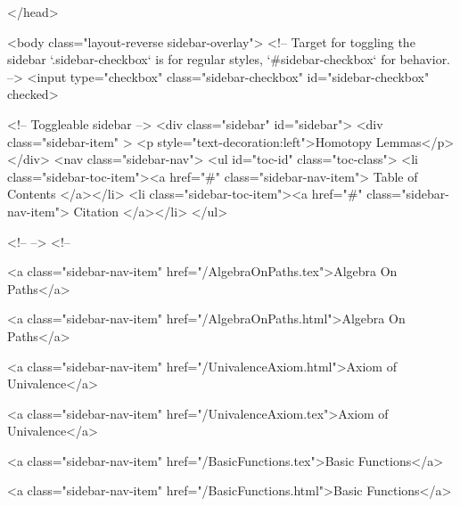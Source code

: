   
</head>




  <body class="layout-reverse sidebar-overlay">
    <!-- Target for toggling the sidebar `.sidebar-checkbox` is for regular
     styles, `#sidebar-checkbox` for behavior. -->
<input type="checkbox" class="sidebar-checkbox" id="sidebar-checkbox" checked>

<!-- Toggleable sidebar -->
<div class="sidebar" id="sidebar">
  <div class="sidebar-item" >
    <p style="text-decoration:left">Homotopy Lemmas</p>
  </div>
  <nav class="sidebar-nav">
    <ul id="toc-id" class="toc-class">
  <li class="sidebar-toc-item"><a href="#" class="sidebar-nav-item"> Table of Contents </a></li>
  <li class="sidebar-toc-item"><a href="#" class="sidebar-nav-item"> Citation </a></li>
</ul>


    <!--  -->
    <!-- 
      
    
      
    
      
    
      
        
      
    
      
        
          <a class="sidebar-nav-item" href="/AlgebraOnPaths.tex">Algebra On Paths</a>
        
      
    
      
        
          <a class="sidebar-nav-item" href="/AlgebraOnPaths.html">Algebra On Paths</a>
        
      
    
      
        
          <a class="sidebar-nav-item" href="/UnivalenceAxiom.html">Axiom of Univalence</a>
        
      
    
      
        
          <a class="sidebar-nav-item" href="/UnivalenceAxiom.tex">Axiom of Univalence</a>
        
      
    
      
        
          <a class="sidebar-nav-item" href="/BasicFunctions.tex">Basic Functions</a>
        
      
    
      
        
          <a class="sidebar-nav-item" href="/BasicFunctions.html">Basic Functions</a>
        
      
    
